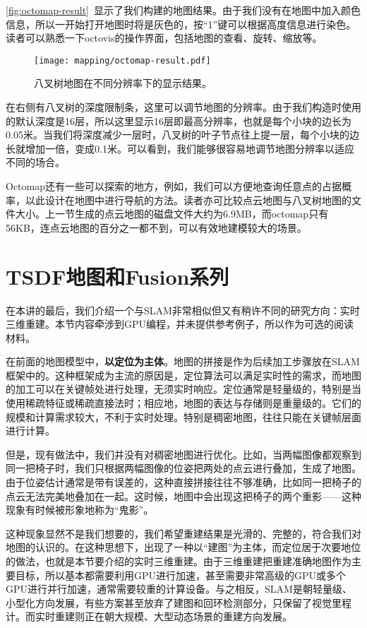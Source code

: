 \autoref{fig:octomap-result}~显示了我们构建的地图结果。由于我们没有在地图中加入颜色信息，所以一开始打开地图时将是灰色的，按“1”键可以根据高度信息进行染色。读者可以熟悉一下octovis的操作界面，包括地图的查看、旋转、缩放等。

\begin{figure}[!htp]
	\centering
	\texttt{[image: mapping/octomap-result.pdf]}
	\caption{八叉树地图在不同分辨率下的显示结果。}
	\label{fig:octomap-result}
\end{figure}

在右侧有八叉树的深度限制条，这里可以调节地图的分辨率。由于我们构造时使用的默认深度是16层，所以这里显示16层即最高分辨率，也就是每个小块的边长为0.05米。当我们将深度减少一层时，八叉树的叶子节点往上提一层，每个小块的边长就增加一倍，变成0.1米。可以看到，我们能够很容易地调节地图分辨率以适应不同的场合。

Octomap还有一些可以探索的地方，例如，我们可以方便地查询任意点的占据概率，以此设计在地图中进行导航的方法\textsuperscript{\cite{Burri2015}}。读者亦可比较点云地图与八叉树地图的文件大小。上一节生成的点云地图的磁盘文件大约为6.9MB，而octomap只有56KB，连点云地图的百分之一都不到，可以有效地建模较大的场景。

\section{\textsuperscript{\ttfamily *} TSDF地图和Fusion系列}

在本讲的最后，我们介绍一个与SLAM非常相似但又有稍许不同的研究方向：实时三维重建。本节内容牵涉到GPU编程，并未提供参考例子，所以作为可选的阅读材料。

在前面的地图模型中，\textbf{以定位为主体}。地图的拼接是作为后续加工步骤放在SLAM框架中的。这种框架成为主流的原因是，定位算法可以满足实时性的需求，而地图的加工可以在关键帧处进行处理，无须实时响应。定位通常是轻量级的，特别是当使用稀疏特征或稀疏直接法时；相应地，地图的表达与存储则是重量级的。它们的规模和计算需求较大，不利于实时处理。特别是稠密地图，往往只能在关键帧层面进行计算。

但是，现有做法中，我们并没有对稠密地图进行优化。比如，当两幅图像都观察到同一把椅子时，我们只根据两幅图像的位姿把两处的点云进行叠加，生成了地图。由于位姿估计通常是带有误差的，这种直接拼接往往不够准确，比如同一把椅子的点云无法完美地叠加在一起。这时候，地图中会出现这把椅子的两个重影——这种现象有时候被形象地称为“鬼影”。

这种现象显然不是我们想要的，我们希望重建结果是光滑的、完整的，符合我们对地图的认识的。在这种思想下，出现了一种以“建图”为主体，而定位居于次要地位的做法，也就是本节要介绍的实时三维重建。由于三维重建把重建准确地图作为主要目标，所以基本都需要利用GPU进行加速，甚至需要非常高级的GPU或多个GPU进行并行加速，通常需要较重的计算设备。与之相反，SLAM是朝轻量级、小型化方向发展，有些方案甚至放弃了建图和回环检测部分，只保留了视觉里程计。而实时重建则正在朝大规模、大型动态场景的重建方向发展。

